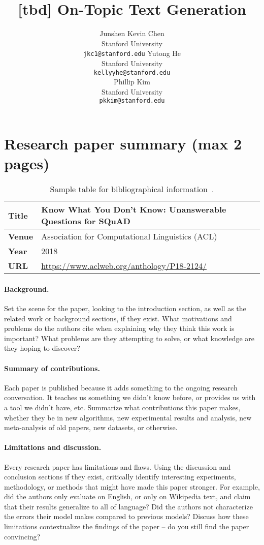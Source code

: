 \documentclass{article}
\title{ [tbd] On-Topic Text Generation }
\author{
  Junshen Kevin Chen \\
  Stanford University\\
  \texttt{jkc1@stanford.edu}
  \And
  Yutong He \\
  Stanford University\\
  \texttt{kellyyhe@stanford.edu} \\
  \And
  Phillip Kim \\
  Stanford University\\
  \texttt{pkkim@stanford.edu}
}
\begin{document}
\maketitle


\section{Research paper summary (max 2 pages)}

\begin{table}[h]
    \centering
    \begin{tabular}{ll}
        \toprule
        \textbf{Title} & Know What You Don't Know: Unanswerable Questions for SQuAD \\
        \midrule
        \textbf{Venue} & Association for Computational Linguistics (ACL) \\
        \textbf{Year}  & 2018 \\
        \textbf{URL}   & \url{https://www.aclweb.org/anthology/P18-2124/} \\
        \bottomrule
    \end{tabular}
    \vspace{1em}
    \caption{Sample table for bibliographical information~\cite{rajpurkar2018know}.}
\end{table}

\paragraph{Background.}
Set the scene for the paper, looking to the introduction section, as well as the related work or background sections, if they exist.
What motivations and problems do the authors cite when explaining why they think this work is important? 
What problems are they attempting to solve, or what knowledge are they hoping to discover?

\paragraph{Summary of contributions.}
Each paper is published because it adds something to the ongoing research conversation. It teaches us something we didn't know before, or provides us with a tool we didn't have, etc.
Summarize what contributions this paper makes, whether they be in new algorithms, new experimental results and analysis, new meta-analysis of old papers, new datasets, or otherwise.

\paragraph{Limitations and discussion.}
Every research paper has limitations and flaws.
Using the discussion and conclusion sections if they exist, critically identify interesting experiments, methodology, or methods that might have made this paper stronger.
For example, did the authors only evaluate on English, or only on Wikipedia text, and claim that their results generalize to all of language?
Did the authors not characterize the errors their model makes compared to previous models?
Discuss how these limitations contextualize the findings of the paper -- do you still find the paper convincing?
\end{document}
